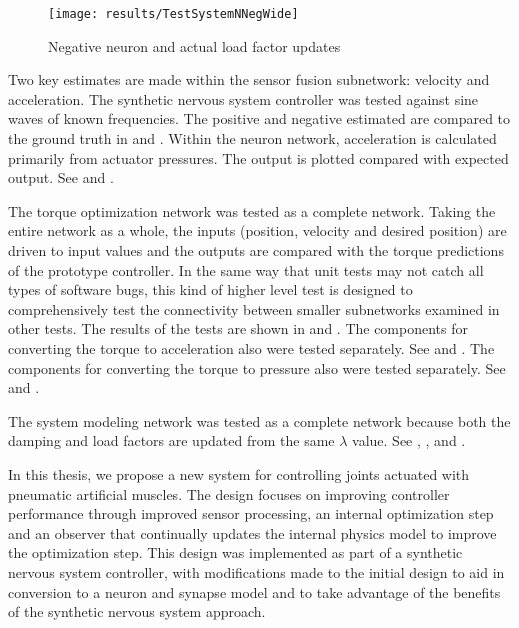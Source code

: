 \begin{figure}
\centering
\texttt{[image: results/TestSystemNNegWide]}
\caption{Negative neuron and actual load factor updates}
\label{fig:TestSystemNNeg}
\end{figure}


Two key estimates are made within the sensor fusion subnetwork: velocity and
acceleration. The synthetic nervous system controller was tested against sine waves of known
frequencies. The positive and negative estimated are compared to the ground truth in  and .
Within the neuron network, acceleration is calculated primarily from actuator
pressures. The output is plotted compared with expected output. See
 and .


The torque optimization network was tested as a complete network. Taking the entire network as a whole, the inputs (position, velocity and desired position) are driven to input values and the outputs are compared with the torque predictions of the prototype controller. In the same way that unit tests may not catch all types of software bugs, this kind of higher level test is designed to comprehensively test the connectivity between smaller subnetworks examined in other tests. The results of the tests are shown in  and .
The components for converting the torque to
acceleration also were tested
separately. See  and .
The components for converting the torque to pressure also were tested
separately. See  and .


The system modeling network was tested as a complete network because both the
damping and load factors are updated from the same $\lambda$ value. See 
, ,
 and .

\label{chap:discussion}

In this thesis, we propose a new system for controlling joints actuated with
pneumatic artificial muscles. The design focuses on improving controller
performance through improved sensor processing, an internal optimization step
and an observer that continually updates the internal physics model to improve
the optimization step. This design was implemented as part of a synthetic
nervous system controller, with modifications made to the initial design to aid
in conversion to a neuron and synapse model and to take advantage of the benefits of the
synthetic nervous system approach.

